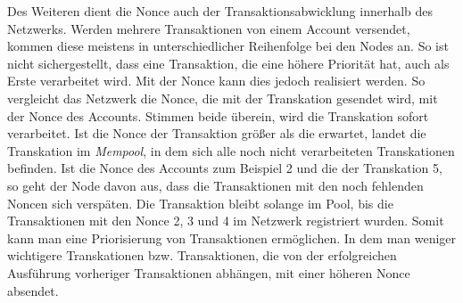 \documentclass[runningheads]{llncs}
\begin{document}

Des Weiteren dient die Nonce auch der Transaktionsabwicklung innerhalb des Netzwerks.  Werden mehrere Transaktionen von einem Account versendet, kommen diese meistens in unterschiedlicher Reihenfolge bei den Nodes an. So ist nicht sichergestellt, dass eine Transaktion, die eine höhere Priorität hat, auch als Erste verarbeitet wird. Mit der Nonce kann dies jedoch realisiert werden. So vergleicht das Netzwerk die Nonce, die mit der Transkation gesendet wird, mit der Nonce des Accounts. Stimmen beide überein, wird die Transkation sofort verarbeitet. Ist die Nonce der Transaktion größer als die erwartet, landet die Transkation im \textit{Mempool}, in dem sich alle noch nicht verarbeiteten Transkationen befinden. Ist die Nonce des Accounts zum Beispiel 2 und die der Transkation 5, so geht der Node davon aus, dass die Transaktionen mit den noch fehlenden Noncen sich verspäten. Die Transaktion bleibt solange im Pool, bis die Transaktionen mit den Nonce 2, 3 und 4 im Netzwerk registriert wurden. Somit kann man eine Priorisierung von Transaktionen ermöglichen. In dem man weniger wichtigere Transkationen bzw. Transaktionen, die von der erfolgreichen Ausführung vorheriger Transaktionen abhängen, mit einer höheren Nonce absendet.
\end{document}
